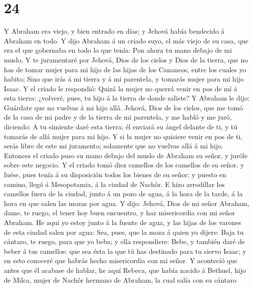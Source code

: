 \hypertarget{section-23}{%
\section{24}\label{section-23}}

 Y Abraham era viejo, y bien entrado en días; y Jehová
había bendecido á Abraham en todo.  Y dijo Abraham á un
criado suyo, el más viejo de su casa, que era el que gobernaba en todo
lo que tenía: Pon ahora tu mano debajo de mi muslo,  Y te
juramentaré por Jehová, Dios de los cielos y Dios de la tierra, que no
has de tomar mujer para mi hijo de las hijas de los Cananeos, entre los
cuales yo habito;  Sino que irás á mi tierra y á mi
parentela, y tomarás mujer para mi hijo Isaac.  Y el
criado le respondió: Quizá la mujer no querrá venir en pos de mí á esta
tierra: ¿volveré, pues, tu hijo á la tierra de donde saliste?
 Y Abraham le dijo: Guárdate que no vuelvas á mi hijo
allá.  Jehová, Dios de los cielos, que me tomó de la casa
de mi padre y de la tierra de mi parentela, y me habló y me juró,
diciendo: A tu simiente daré esta tierra; él enviará su ángel delante de
ti, y tú tomarás de allá mujer para mi hijo.  Y si la
mujer no quisiere venir en pos de ti, serás libre de este mi juramento;
solamente que no vuelvas allá á mi hijo.  Entonces el
criado puso su mano debajo del muslo de Abraham su señor, y juróle sobre
este negocio.  Y el criado tomó diez camellos de los
camellos de su señor, y fuése, pues tenía á su disposición todos los
bienes de su señor: y puesto en camino, llegó á Mesopotamia, á la ciudad
de Nachôr.  E hizo arrodillar los camellos fuera de la
ciudad, junto á un pozo de agua, á la hora de la tarde, á la hora en que
salen las mozas por agua.  Y dijo: Jehová, Dios de mi
señor Abraham, dame, te ruego, el tener hoy buen encuentro, y haz
misericordia con mi señor Abraham.  He aquí yo estoy
junto á la fuente de agua, y las hijas de los varones de esta ciudad
salen por agua:  Sea, pues, que la moza á quien yo
dijere: Baja tu cántaro, te ruego, para que yo beba; y ella respondiere:
Bebe, y también daré de beber á tus camellos: que sea ésta la que tú has
destinado para tu siervo Isaac; y en esto conoceré que habrás hecho
misericordia con mi señor.  Y aconteció que antes que él
acabase de hablar, he aquí Rebeca, que había nacido á Bethuel, hijo de
Milca, mujer de Nachôr hermano de Abraham, la cual salía con su cántaro
